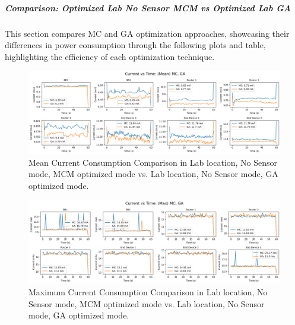 \subparagraph{Comparison: Optimized Lab No Sensor MCM vs Optimized Lab GA}
This section compares MC and GA optimization approaches, showcasing their differences in power consumption through the following plots and table, highlighting the efficiency of each optimization technique.

\begin{figure}[H]
  \centering
  \includegraphics[width=1\textwidth]{images/research_results/current_consumption_analysis/optimized/lab/no_sensor/ga/comparison/mean_comparison_lab_no-sensor_mc_vs_lab_no-sensor_ga.png}
    \caption{Mean Current Consumption Comparison in Lab location, No Sensor mode, MCM optimized mode vs. Lab location, No Sensor mode, GA optimized mode.}
    \label{fig:mean_comparison_lab_no-sensor_mc_vs_lab_no-sensor_ga}
\end{figure}

\begin{figure}[H]
  \centering
  \includegraphics[width=1\textwidth]{images/research_results/current_consumption_analysis/optimized/lab/no_sensor/ga/comparison/max_comparison_lab_no-sensor_mc_vs_lab_no-sensor_ga.png}
    \caption{Maximum Current Consumption Comparison in Lab location, No Sensor mode, MCM optimized mode vs. Lab location, No Sensor mode, GA optimized mode.}
    \label{fig:max_comparison_lab_no-sensor_mc_vs_lab_no-sensor_ga}
\end{figure}

